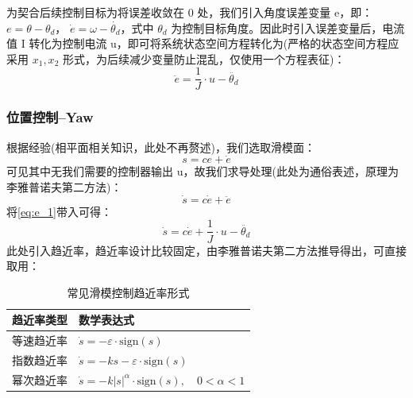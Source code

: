 \documentclass[12pt]{article}
\begin{document}
        \par
        为契合后续控制目标为将误差收敛在 0 处，我们引入角度误差变量 e，即：
        $e = \theta - \theta_d$， $\dot{e} = \omega - \dot{\theta_d}$，式中 $\theta_d$ 为控制目标角度。因此时引入误差变量后，电流值 I 转化为控制电流 u，即可将系统状态空间方程转化为(严格的状态空间方程应采用 $x_1,x_2$ 形式，为后续减少变量防止混乱，仅使用一个方程表征)：
            \begin{equation}
                \ddot{e} = \frac{1}{J} \cdot u - \ddot{\theta_d} 
                \label{eq:e_1}
            \end{equation}

        \subsubsection{位置控制--Yaw}
        根据经验(相平面相关知识，此处不再赘述)，我们选取滑模面：
            \begin{equation}
                s = ce + \dot{e} 
                \label{eq:s_1}
            \end{equation}
        可见其中无我们需要的控制器输出 u，故我们求导处理(此处为通俗表述，原理为李雅普诺夫第二方法)：
            \begin{equation}
                \dot{s} = c\dot{e} + \ddot{e} 
                \label{eq:s_2}
            \end{equation}
        将\cref{eq:e_1}带入可得：
            \begin{equation}
                \dot{s} = c\dot{e} + \frac{1}{J} \cdot u - \ddot{\theta_d}
                \label{eq:s_3}
            \end{equation}
        此处引入趋近率，趋近率设计比较固定，由李雅普诺夫第二方法推导得出，可直接取用：
            \begin{table}[htbp]
                \centering
                \renewcommand{\arraystretch}{1.5}
                \begin{tabular}{|c|l|}
                \hline
                \textbf{趋近率类型} & \textbf{数学表达式} \\
                \hline
                等速趋近率 & $\dot{s} = -\varepsilon \cdot \text{sign}(s)$ \\
                \hline
                指数趋近率 & $\dot{s} = -k s - \varepsilon \cdot \text{sign}(s)$ \\
                \hline
                幂次趋近率 & $\dot{s} = -k |s|^\alpha \cdot \text{sign}(s), \quad 0 < \alpha < 1$ \\
                \hline
                \end{tabular}
                \caption{常见滑模控制趋近率形式}
                \label{tab:reaching_laws}
            \end{table}
\end{document}
